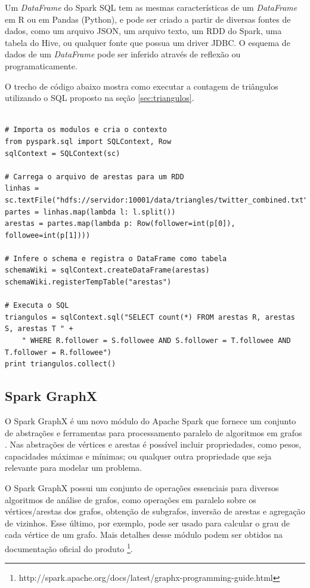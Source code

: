 Um \emph{DataFrame} do Spark SQL tem as mesmas características de um \emph{DataFrame} em R ou em 
Pandas (Python), e pode ser criado a partir de diversas fontes de dados, como um arquivo JSON, um 
arquivo texto, um RDD do Spark, uma tabela do Hive, ou qualquer fonte que possua um driver JDBC. 
O esquema de dados de um \emph{DataFrame} pode ser inferido através de reflexão ou programaticamente. 

O trecho de código abaixo mostra como executar a contagem de triângulos utilizando o SQL proposto na 
seção \ref{sec:triangulos}.


\begin{lstlisting}[style=MyPythonStyle]

# Importa os modulos e cria o contexto
from pyspark.sql import SQLContext, Row
sqlContext = SQLContext(sc)

# Carrega o arquivo de arestas para um RDD
linhas = sc.textFile("hdfs://servidor:10001/data/triangles/twitter_combined.txt")
partes = linhas.map(lambda l: l.split())
arestas = partes.map(lambda p: Row(follower=int(p[0]), followee=int(p[1])))

# Infere o schema e registra o DataFrame como tabela
schemaWiki = sqlContext.createDataFrame(arestas)
schemaWiki.registerTempTable("arestas")

# Executa o SQL
triangulos = sqlContext.sql("SELECT count(*) FROM arestas R, arestas S, arestas T " +
    " WHERE R.follower = S.followee AND S.follower = T.followee AND T.follower = R.followee")
print triangulos.collect()

\end{lstlisting}


\subsection{Spark GraphX}

O Spark GraphX é um novo módulo do Apache Spark que fornece um conjunto de abstrações e ferramentas 
para processamento paralelo de algoritmos em grafos \cite{xin2013graphx}. Nas abstrações de 
vértices e arestas é possível 
incluir propriedades, como pesos, capacidades máximas e mínimas; ou qualquer outra propriedade que 
seja relevante para modelar um problema. 

O Spark GraphX possui um conjunto de operações essenciais para diversos algoritmos de análise de grafos, 
como operações em paralelo sobre os vértices/arestas dos grafos, obtenção de subgrafos, inversão de 
arestas e agregação de vizinhos. Esse último, por exemplo, pode ser usado para calcular o grau de cada 
vértice de um grafo. Mais detalhes desse módulo podem ser obtidos na documentação oficial do produto 
\footnote{http://spark.apache.org/docs/latest/graphx-programming-guide.html}. 

